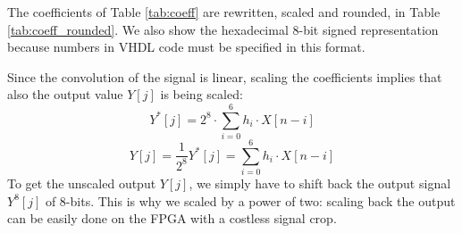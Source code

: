 The coefficients of Table \ref{tab:coeff} are rewritten, scaled and rounded, in Table \ref{tab:coeff_rounded}. We also show the hexadecimal 8-bit signed representation because numbers in VHDL code must be specified in this format.

\begin{table}[H]
    \renewcommand{\arraystretch}{1.2}
    \centering
    \caption{The FIR coefficients used as default filter specifications. The float values have been scaled by a factor of $2^8$, then rounded to the closest integer. We assume that the coefficients are symmetric, so we show only the first 4 values (out of 7 coefficients).}
    \label{tab:coeff_rounded}
\end{table}

Since the convolution of the signal is linear, scaling the coefficients implies that also the output value $Y[j]$ is being scaled:
\[ Y^*[j] = 2^8 \cdot \sum_{i=0}^{6} h_i \cdot X[n-i] \]
\[ Y[j] = \frac{1}{2^8} Y^*[j] = \sum_{i=0}^{6} h_i \cdot X[n-i] \]
To get the unscaled output $Y[j]$, we simply have to shift back the output signal $Y^8[j]$ of 8-bits. This is why we scaled by a power of two: scaling back the output can be easily done on the FPGA with a costless signal crop.



